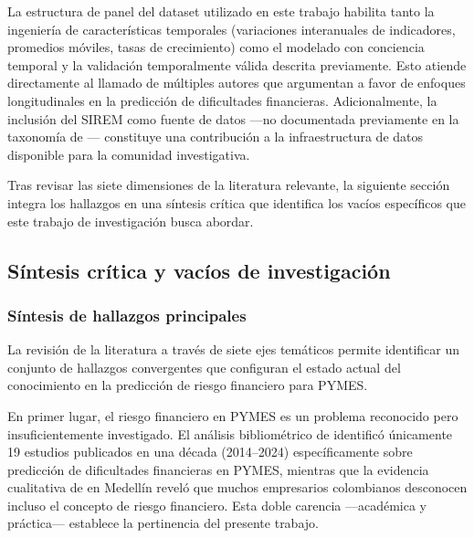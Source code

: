 \documentclass[12pt, letterpaper]{article}
\begin{document}
La estructura de panel del dataset utilizado en este trabajo habilita tanto la ingenier\'ia de caracter\'isticas temporales (variaciones interanuales de indicadores, promedios m\'oviles, tasas de crecimiento) como el modelado con conciencia temporal y la validaci\'on temporalmente v\'alida descrita previamente. Esto atiende directamente al llamado de m\'ultiples autores \citep{Zhou2022, Otsuki2022, Zhang2025, Bortolotti2024} que argumentan a favor de enfoques longitudinales en la predicci\'on de dificultades financieras. Adicionalmente, la inclusi\'on del SIREM como fuente de datos ---no documentada previamente en la taxonom\'ia de \citet{Wang2024datasets}--- constituye una contribuci\'on a la infraestructura de datos disponible para la comunidad investigativa.

Tras revisar las siete dimensiones de la literatura relevante, la siguiente secci\'on integra los hallazgos en una s\'intesis cr\'itica que identifica los vac\'ios espec\'ificos que este trabajo de investigaci\'on busca abordar.

\subsection{S\'intesis cr\'itica y vac\'ios de investigaci\'on}
\label{sec:sintesis}

\subsubsection{S\'intesis de hallazgos principales}

La revisi\'on de la literatura a trav\'es de siete ejes tem\'aticos permite identificar un conjunto de hallazgos convergentes que configuran el estado actual del conocimiento en la predicci\'on de riesgo financiero para PYMES.

En primer lugar, el riesgo financiero en PYMES es un problema reconocido pero insuficientemente investigado. El an\'alisis bibliom\'etrico de \citet{Abubakar2025} identific\'o \'unicamente 19 estudios publicados en una d\'ecada (2014--2024) espec\'ificamente sobre predicci\'on de dificultades financieras en PYMES, mientras que la evidencia cualitativa de \citet{CardonaZuleta2025} en Medell\'in revel\'o que muchos empresarios colombianos desconocen incluso el concepto de riesgo financiero. Esta doble carencia ---acad\'emica y pr\'actica--- establece la pertinencia del presente trabajo.
\end{document}
